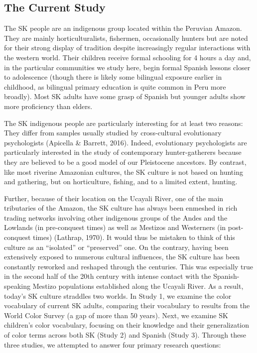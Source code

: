 \documentclass[
  english,
  ,man,floatsintext]{apa6}
\begin{document}
\hypertarget{the-current-study}{%
\subsection{The Current Study}\label{the-current-study}}

The SK people are an indigenous group located within the Peruvian Amazon. They are mainly horticulturalists, fishermen, occasionally hunters but are noted for their strong display of tradition despite increasingly regular interactions with the western world. Their children receive formal schooling for 4 hours a day and, in the particular communities we study here, begin formal Spanish lessons closer to adolescence (though there is likely some bilingual exposure earlier in childhood, as bilingual primary education is quite common in Peru more broadly). Most SK adults have some grasp of Spanish but younger adults show more proficiency than elders.

The SK indigenous people are particularly interesting for at least two reasons: They differ from samples usually studied by cross-cultural evolutionary psychologists (Apicella \& Barrett, 2016). Indeed, evolutionary psychologists are particularly interested in the study of contemporary hunter-gatherers because they are believed to be a good model of our Pleistocene ancestors. By contrast, like most riverine Amazonian cultures, the SK culture is not based on hunting and gathering, but on horticulture, fishing, and to a limited extent, hunting.

Further, because of their location on the Ucayali River, one of the main tributaries of the Amazon, the SK culture has always been enmeshed in rich trading networks involving other indigenous groups of the Andes and the Lowlands (in pre-conquest times) as well as Mestizos and Westerners (in post-conquest times) (Lathrap, 1970). It would thus be mistaken to think of this culture as an \enquote{isolated} or \enquote{preserved} one. On the contrary, having been extensively exposed to numerous cultural influences, the SK culture has been constantly reworked and reshaped through the centuries. This was especially true in the second half of the 20th century with intense contact with the Spanish-speaking Mestizo populations established along the Ucayali River. As a result, today's SK culture straddles two worlds.
In Study 1, we examine the color vocabulary of current SK adults, comparing their vocabulary to results from the World Color Survey (a gap of more than 50 years). Next, we examine SK children's color vocabulary, focusing on their knowledge and their generalization of color terms across both SK (Study 2) and Spanish (Study 3). Through these three studies, we attempted to answer four primary research questions:
\end{document}
